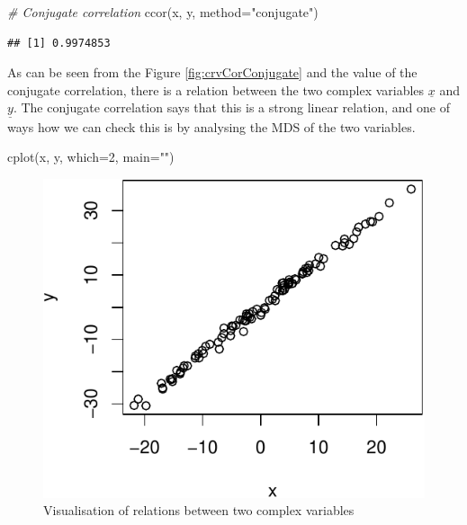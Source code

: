 \documentclass[
]{book}
\newenvironment{Shaded}{\begin{snugshade}}{\end{snugshade}}
\newcommand{\AttributeTok}[1]{\textcolor[rgb]{0.77,0.63,0.00}{#1}}
\newcommand{\CommentTok}[1]{\textcolor[rgb]{0.56,0.35,0.01}{\textit{#1}}}
\newcommand{\DecValTok}[1]{\textcolor[rgb]{0.00,0.00,0.81}{#1}}
\newcommand{\FunctionTok}[1]{\textcolor[rgb]{0.00,0.00,0.00}{#1}}
\newcommand{\NormalTok}[1]{#1}
\newcommand{\StringTok}[1]{\textcolor[rgb]{0.31,0.60,0.02}{#1}}
\begin{document}
\begin{Shaded}
\begin{Highlighting}[]
\CommentTok{\# Conjugate correlation}
\FunctionTok{ccor}\NormalTok{(x, y, }\AttributeTok{method=}\StringTok{"conjugate"}\NormalTok{)}
\end{Highlighting}
\end{Shaded}

\begin{verbatim}
## [1] 0.9974853
\end{verbatim}

As can be seen from the Figure \ref{fig:crvCorConjugate} and the value of the conjugate correlation, there is a relation between the two complex variables \(\underline{x}\) and \(\underline{y}\). The conjugate correlation says that this is a strong linear relation, and one of ways how we can check this is by analysing the MDS of the two variables.

\begin{Shaded}
\begin{Highlighting}[]
\FunctionTok{cplot}\NormalTok{(x, y, }\AttributeTok{which=}\DecValTok{2}\NormalTok{, }\AttributeTok{main=}\StringTok{""}\NormalTok{)}
\end{Highlighting}
\end{Shaded}

\begin{figure}
\centering
\includegraphics{Svetunkov---Svetunkov---Complex-Valued-Econometrics_files/figure-latex/crvCorConjugateMDS-1.pdf}
\caption{\label{fig:crvCorConjugateMDS}Visualisation of relations between two complex variables}
\end{figure}
\end{document}
